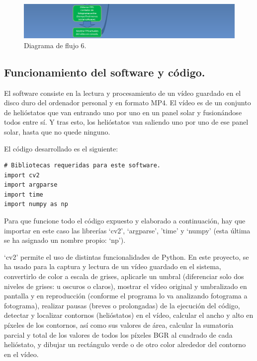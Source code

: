 \begin{figure}[h!]
  	\centering
	\includegraphics[width=\textwidth]{DiagramaFlujoSoftwareTFG/diagramaFlujo6.PNG}
	\caption{Diagrama de flujo 6.
	\label{fig:DiagramaFlujoSoftwareTFG/diagramaFlujo6.PNG}}
\end{figure}

\subsection{Funcionamiento del software y código.}

El software consiste en la lectura y procesamiento de un vídeo guardado en el disco duro del ordenador personal y en formato MP4. El vídeo es de un conjunto de helióstatos que van entrando uno por uno en un panel solar y fusionándose todos entre sí. Y tras esto, los helióstatos van saliendo uno por uno de ese panel solar, hasta que no quede ninguno.

El código desarrollado es el siguiente:\\[20pt]

\begin{lstlisting}
# Bibliotecas requeridas para este software.
import cv2
import argparse
import time
import numpy as np
\end{lstlisting}

Para que funcione todo el código expuesto y elaborado a continuación, hay que importar en este caso las librerías ‘cv2’, ‘argparse’, 'time' y ‘numpy’ (esta última se ha asignado un nombre propio: ‘np’).

‘cv2’ permite el uso de distintas funcionalidades de Python. En este proyecto, se ha usado para la captura y lectura de un vídeo guardado en el sistema, convertirlo de color a escala de grises, aplicarle un umbral (diferenciar solo dos niveles de grises: u oscuros o claros), mostrar el vídeo original y umbralizado en pantalla y en reproducción (conforme el programa lo va analizando fotograma a fotograma), realizar pausas (breves o prolongadas) de la ejecución del código, detectar y localizar contornos (helióstatos) en el vídeo, calcular el ancho y alto en píxeles de los contornos, así como sus valores de área, calcular la sumatoria parcial y total de los valores de todos los píxeles BGR al cuadrado de cada helióstato, y dibujar un rectángulo verde o de otro color alrededor del contorno en el vídeo.

